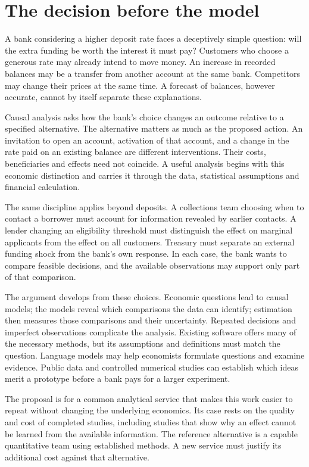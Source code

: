 \chapter*{The decision before the model}

A bank considering a higher deposit rate faces a deceptively simple question:
will the extra funding be worth the interest it must pay? Customers who choose
a generous rate may already intend to move money. An increase in recorded
balances may be a transfer from another account at the same bank. Competitors
may change their prices at the same time. A forecast of balances, however
accurate, cannot by itself separate these explanations.

Causal analysis asks how the bank's choice changes an outcome relative to a
specified alternative. The alternative matters as much as the proposed action.
An invitation to open an account, activation of that account, and a change in
the rate paid on an existing balance are different interventions. Their costs,
beneficiaries and effects need not coincide. A useful analysis begins with this
economic distinction and carries it through the data, statistical assumptions
and financial calculation.

The same discipline applies beyond deposits. A collections team choosing
when to contact a borrower must account for information revealed by earlier
contacts. A lender changing an eligibility threshold must distinguish the
effect on marginal applicants from the effect on all customers. Treasury must
separate an external funding shock from the bank's own response. In each case,
the bank wants to compare feasible decisions, and the available observations
may support only part of that comparison.

The argument develops from these choices. Economic questions lead to causal
models; the models reveal which comparisons the data can identify; estimation
then measures those comparisons and their uncertainty. Repeated decisions and
imperfect observations complicate the analysis. Existing software offers many
of the necessary methods, but its assumptions and definitions must match the
question. Language models may help economists formulate questions and examine
evidence. Public data and controlled numerical studies can establish which
ideas merit a prototype before a bank pays for a larger experiment.

The proposal is for a common analytical service that makes this work easier to
repeat without changing the underlying economics. Its case rests on the
quality and cost of completed studies, including studies that show why an
effect cannot be learned from the available information. The reference
alternative is a capable quantitative team using established methods. A new
service must justify its additional cost against that alternative.

